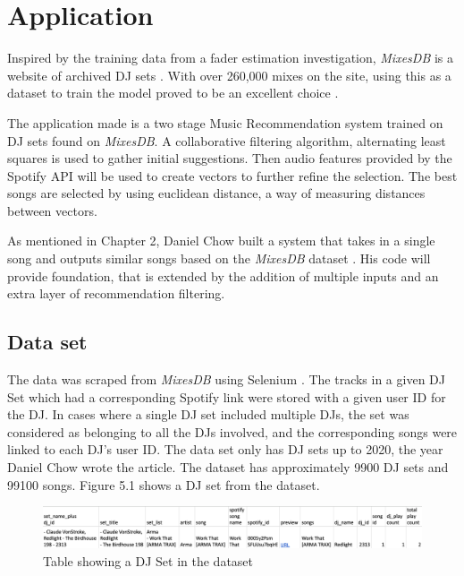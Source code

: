 
\graphicspath{{Chapter5/}}



\chapter{Application}

Inspired by the training data from a fader estimation investigation, \textit{MixesDB} is a website of archived DJ sets \citep{kim_automatic_2017}. With over 260,000 mixes on the site, using this as a dataset to train the model proved to be an excellent choice \citep{mixesdb_main_2023}.
 
 The application made is a two stage Music Recommendation system trained on DJ sets found on \textit{MixesDB}. A collaborative filtering algorithm, alternating least squares is used to gather initial suggestions. Then audio features provided by the Spotify API will be used to create vectors to further refine the selection. The best songs are selected by using euclidean distance, a way of measuring distances between vectors.
 
 As mentioned in Chapter 2, Daniel Chow built a system that takes in a single song and outputs similar songs based on the \textit{MixesDB} dataset \citep{chow_music_2020}. His code will provide foundation, that is extended by the addition of multiple inputs and an extra layer of recommendation filtering.

\section{Data set}
The data was scraped from \textit{MixesDB} using Selenium \citep{chow_music_2020}. The tracks in a given DJ Set which had a corresponding Spotify link were stored with a given user ID for the DJ.  In cases where a single DJ set included multiple DJs, the set was considered as belonging to all the DJs involved, and the corresponding songs were linked to each DJ's user ID. The data set only has DJ sets up to 2020, the year Daniel Chow wrote the article. The dataset has approximately 9900 DJ sets and 99100 songs. Figure 5.1 shows a DJ set from the dataset.
\begin{figure}[H]
	\includegraphics[scale=0.4]{images/dataset}
	\centering
	\caption{Table showing a DJ Set in the dataset} 
\end{figure}


